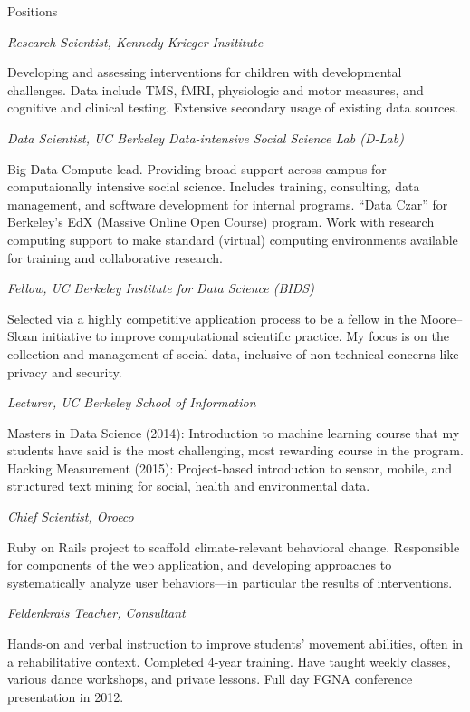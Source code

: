 \begin{rubric}{Positions}

\entry*[2016--present] \emph{Research Scientist, Kennedy Krieger Insititute}
\par Developing and assessing interventions for children with developmental
challenges. Data include TMS, fMRI, physiologic and motor measures, and
cognitive and clinical testing. Extensive secondary usage of existing data
sources.

\entry*[2013--2016] \emph{Data Scientist, UC Berkeley Data-intensive Social
    Science Lab (D-Lab)}
\par Big Data Compute lead. Providing broad support across campus for
computaionally intensive social science. Includes training, consulting, data
management, and software development for internal programs. “Data Czar” for
Berkeley's EdX (Massive Online Open Course) program. Work with research
computing support to make standard (virtual) computing environments available
for training and collaborative research.

\entry*[2014--2016] \emph{Fellow, UC Berkeley Institute for Data Science
    (BIDS)}
\par Selected via a highly competitive application process to be a fellow in the
Moore--Sloan initiative to improve computational scientific practice. My focus
is on the collection and management of social data, inclusive of non-technical
concerns like privacy and security.

\entry*[2014, 2015] \emph{Lecturer, UC Berkeley School of Information} 
\par Masters in Data Science (2014): Introduction to machine learning course
that my students have said is the most challenging, most rewarding course in
the program. Hacking Measurement (2015): Project-based introduction to sensor,
mobile, and structured text mining for social, health and environmental data.

\entry*[2012--2014] \emph{Chief Scientist, Oroeco}
\par Ruby on Rails project to scaffold climate-relevant behavioral change.
Responsible for components of the web application, and developing approaches
to systematically analyze user behaviors---in particular the results of
interventions.

\entry*[2007--present] \emph{Feldenkrais Teacher, Consultant}
\par  Hands-on and verbal instruction to improve students' movement
abilities, often in a rehabilitative context.
Completed 4-year training. Have taught weekly classes, various dance
workshops, and private lessons. Full day FGNA conference presentation in
2012.


\end{rubric}
